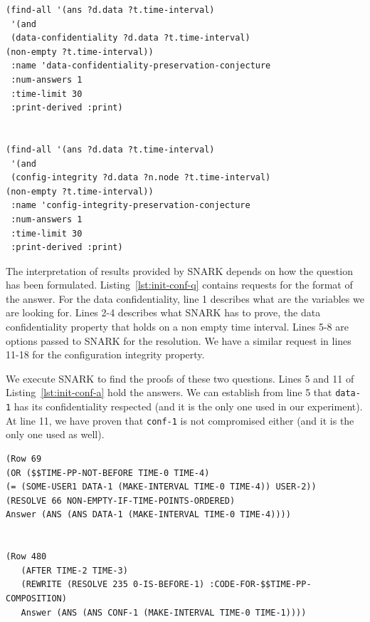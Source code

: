 \begin{lstlisting}[caption=SNARK question to validate the initial situation., label=lst:init-conf-q,captionpos=b] 
(find-all '(ans ?d.data ?t.time-interval)
 '(and
 (data-confidentiality ?d.data ?t.time-interval)
(non-empty ?t.time-interval))
 :name 'data-confidentiality-preservation-conjecture
 :num-answers 1
 :time-limit 30  
 :print-derived :print)


(find-all '(ans ?d.data ?t.time-interval)
 '(and
 (config-integrity ?d.data ?n.node ?t.time-interval)
(non-empty ?t.time-interval))
 :name 'config-integrity-preservation-conjecture
 :num-answers 1
 :time-limit 30  
 :print-derived :print)
\end{lstlisting}

The interpretation of results provided by SNARK depends on how the question has been formulated.
Listing~\ref{lst:init-conf-q} contains requests for the format of the answer.
For the data confidentiality, line 1 describes what are the variables we are looking for. Lines 2-4 describes what SNARK has to prove, \ie the data confidentiality property that holds on a non empty time interval.
Lines 5-8 are options passed to SNARK for the resolution.
We have a similar request in lines 11-18 for the configuration integrity property.

We execute SNARK to find the proofs of these two questions.
Lines 5 and 11 of Listing~\ref{lst:init-conf-a} hold the answers.
We can establish from line 5 that \verb'data-1' has its confidentiality respected (and it is the only one used in our experiment).
At line 11, we have proven that \verb'conf-1' is not compromised either (and it is the only one used as well).

\begin{lstlisting}[caption=SNARK validating the initial situation, label=lst:init-conf-a,captionpos=b] 
(Row 69
(OR ($$TIME-PP-NOT-BEFORE TIME-0 TIME-4) 
(= (SOME-USER1 DATA-1 (MAKE-INTERVAL TIME-0 TIME-4)) USER-2))
(RESOLVE 66 NON-EMPTY-IF-TIME-POINTS-ORDERED)
Answer (ANS (ANS DATA-1 (MAKE-INTERVAL TIME-0 TIME-4)))) 


(Row 480
   (AFTER TIME-2 TIME-3)
   (REWRITE (RESOLVE 235 0-IS-BEFORE-1) :CODE-FOR-$$TIME-PP-COMPOSITION)
   Answer (ANS (ANS CONF-1 (MAKE-INTERVAL TIME-0 TIME-1)))) 
\end{lstlisting}


